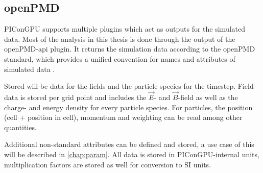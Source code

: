 \documentclass[bachelor_thesis]{subfiles}
\begin{document}
\subsection{openPMD}
PIConGPU supports multiple plugins which act as outputs for the simulated data. Most of the analysis in this thesis is done through the output of the openPMD-api \cite{openPMDAPI} plugin.
It returns the simulation data according to the openPMD standard, which provides a unified convention for names and attributes of simulated data \cite{openPMDstandard}.

Stored will be data for the fields and the particle species for the timestep. Field data is stored per grid point and includes the $\vec{E}$- and $\vec{B}$-field as well as the charge- and energy density for every particle species.
For particles, the position (cell + position in cell), momentum and weighting can be read among other quantities. 

Additional non-standard attributes can be defined and stored, a use case of this will be described in \autoref{chap:param}. All data is stored in PIConGPU-internal units, multiplication factors are stored as well for conversion to SI units.
\end{document}
